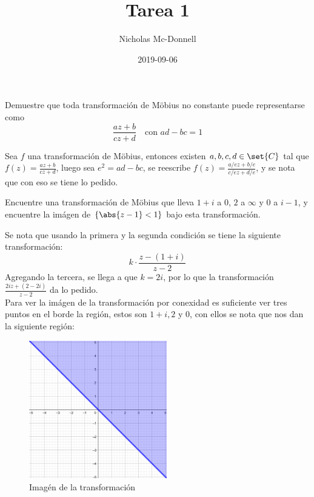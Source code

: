 \documentclass{homework}
\title{Tarea 1}
\date{2019-09-06}
\author{Nicholas Mc-Donnell}
\begin{document}
\maketitle
{}
\newpage
\tableofcontents
\newpage
{}
\begin{prob}
    Demuestre que toda transformación de Möbius no constante puede representarse como
    \[\frac{az+b}{cz+d}\quad\text{con }ad-bc=1\]
\end{prob}

\begin{sol}
    Sea \(f\) una transformación de Möbius, entonces existen \(a,b,c,d\in\set{C}\) tal que \(f(z)=\frac{az+b}{cz+d}\), luego sea \(e^2=ad-bc\), se reescribe \(f(z)=\frac{a/ez+b/e}{c/ez+d/e}\), y se nota que con eso se tiene lo pedido.
\end{sol}

\begin{prob}
    Encuentre una transformación de Möbius que lleva \(1+i\) a \(0\), \(2\) a \(\infty\) y \(0\) a \(i-1\), y encuentre la imágen de \(\{\abs{z-1}<1\}\) bajo esta transformación.
\end{prob}

\begin{sol}
    Se nota que usando la primera y la segunda condición se tiene la siguiente transformación:
    \begin{equation*}
        k\cdot\frac{z-(1+i)}{z-2}
    \end{equation*}
    Agregando la tercera, se llega a que \(k=2i\), por lo que la transformación \(\frac{2iz+(2-2i)}{z-2}\) da lo pedido.\\
    Para ver la imágen de la transformación por conexidad es suficiente ver tres puntos en el borde la región, estos son \(1+i,2\) y \(0\), con ellos se nota que nos dan la siguiente región:
    \begin{figure}[H]
        \centering
        \includegraphics[width=6cm, height=6cm]{geogebra-export.png}
        \caption{Imagén de la transformación}
    \end{figure}
\end{sol}
\end{document}

